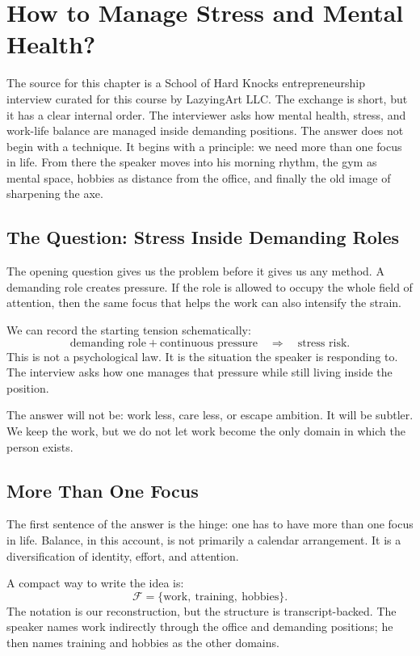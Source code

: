 \chapter{How to Manage Stress and Mental Health?}

The source for this chapter is a School of Hard Knocks entrepreneurship interview curated for this course by LazyingArt LLC. The exchange is short, but it has a clear internal order. The interviewer asks how mental health, stress, and work-life balance are managed inside demanding positions. The answer does not begin with a technique. It begins with a principle: we need more than one focus in life. From there the speaker moves into his morning rhythm, the gym as mental space, hobbies as distance from the office, and finally the old image of sharpening the axe.

\section{The Question: Stress Inside Demanding Roles}

The opening question gives us the problem before it gives us any method. A demanding role creates pressure. If the role is allowed to occupy the whole field of attention, then the same focus that helps the work can also intensify the strain.

We can record the starting tension schematically:
\begin{equation}
\text{demanding role}
+
\text{continuous pressure}
\quad \Longrightarrow \quad
\text{stress risk}.
\end{equation}
This is not a psychological law. It is the situation the speaker is responding to. The interview asks how one manages that pressure while still living inside the position.

The answer will not be: work less, care less, or escape ambition. It will be subtler. We keep the work, but we do not let work become the only domain in which the person exists.

\section{More Than One Focus}

The first sentence of the answer is the hinge: one has to have more than one focus in life. Balance, in this account, is not primarily a calendar arrangement. It is a diversification of identity, effort, and attention.

A compact way to write the idea is:
\begin{equation}
\mathcal{F}
=
\{\text{work},\ \text{training},\ \text{hobbies}\}.
\end{equation}
The notation is our reconstruction, but the structure is transcript-backed. The speaker names work indirectly through the office and demanding positions; he then names training and hobbies as the other domains.

